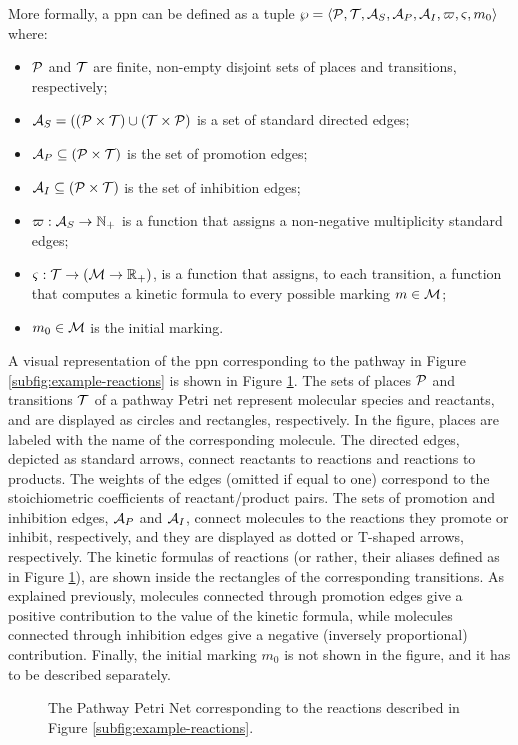 More formally, a \gls{ppn} can be defined as a tuple $\wp = \Tuple{\Cal{P},\Cal{T},\Cal{A}_{S}, \Cal{A}_{P},\Cal{A}_{I},\varpi,\varsigma,m_0}$ where:
\begin{itemize}
    \item $\Cal{P}$ and $\Cal{T}$ are finite, non-empty disjoint sets of places and transitions, respectively;
    \item $\Cal{A}_{S} = ((\Cal{P}\times \Cal{T}) \cup (\Cal{T}\times \Cal{P})$ is a set of standard directed edges;
    \item $\Cal{A}_{P} \subseteq (\Cal{P} \times \Cal{T})$ is the set of promotion edges;
    \item $\Cal{A}_{I} \subseteq (\Cal{P} \times \Cal{T})$ is the set of inhibition edges;
    \item $\varpi: \Cal{A}_{S} \shortrightarrow \Natural_{+}$ is a function that assigns a non-negative multiplicity standard edges;
    \item $\varsigma:\Cal{T} \shortrightarrow (\Cal{M} \rightarrow \Real_{+})$,  is a function that assigns, to each transition, a function that computes a kinetic formula to every possible marking $m \in \Cal{M}$;
    \item $m_0 \in \Cal{M}$ is the initial marking.
\end{itemize}
A visual representation of the \gls{ppn} corresponding to the pathway in Figure \ref{subfig:example-reactions} is shown in Figure \ref{subfig:pathway-petri-net}. The sets of places $\Cal{P}$ and transitions $\Cal{T}$ of a pathway Petri net represent molecular species and reactants, and are displayed as circles and rectangles, respectively. In the figure, places are labeled with the name of the corresponding molecule. The directed edges, depicted as standard arrows, connect reactants to reactions and reactions to products. The weights of the edges (omitted if equal to one) correspond to the stoichiometric coefficients of reactant/product pairs. The sets of promotion and inhibition edges, $\Cal{A}_{P}$ and $\Cal{A}_{I}$, connect molecules to the reactions they promote or inhibit, respectively, and they are displayed as dotted or T-shaped arrows, respectively. The kinetic formulas of reactions (or rather, their aliases defined as in Figure \ref{subfig:pathway-petri-net}), are shown inside the rectangles of the corresponding transitions. As explained previously, molecules connected through promotion edges give a positive contribution to the value of the kinetic formula, while molecules connected through inhibition edges give a negative (inversely proportional) contribution. Finally, the initial marking $m_0$ is not shown in the figure, and it has to be described separately.
\begin{figure}[h!]
    \centering
    \resizebox{.6\textwidth}{!}{}
    \caption{The Pathway Petri Net corresponding to the reactions described in Figure \ref{subfig:example-reactions}.}
    \label{subfig:pathway-petri-net}
\end{figure}

